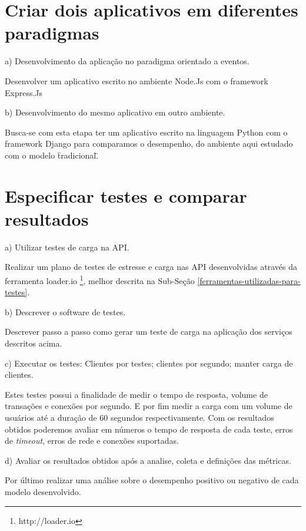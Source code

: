 \section{Criar dois aplicativos em diferentes paradigmas}
  
  \begin{compactitem}
    \item[a)] Desenvolvimento da aplicação no paradigma orientado a eventos.
    
    Desenvolver um aplicativo escrito no ambiente Node.Js com o framework Express.Js
    
    \item[b)] Desenvolvimento do mesmo aplicativo em outro ambiente.
    
    Busca-se com esta etapa ter um aplicativo escrito na linguagem Python com o framework Django
    para comparamos o desempenho, do ambiente aqui estudado com o modelo \"tradicional\".
    
  \end{compactitem}

\section{Especificar testes e comparar resultados}

  \begin{compactitem}
    \item[a)] Utilizar testes de carga na \ac{API}.
    
    Realizar um plano de testes de estresse e carga nas \ac{API} desenvolvidas através
    da ferramenta loader.io \footnote{\label{noteloader}http://loader.io}, melhor descrita na Sub-Seção \ref{ferramentas-utilizadas-para-testes}.
    
    
    \item[b)] Descrever o software de testes.
    
    Descrever passo a passo como gerar um teste de carga na aplicação dos serviços descritos acima.
    
    \item[c)] Executar os testes: Clientes por testes; clientes por segundo; manter carga de clientes.
    
    Estes testes possui a finalidade de medir o tempo de resposta, volume de transações e conexões por segundo. E por fim
    medir a carga com um volume de usuários até a duração de 60 segundos respectivamente. 
    Com os resultados obtidos poderemos avaliar em números o tempo de resposta de cada teste,
    erros de \textit{timeout}, erros de rede e conexões suportadas. 
    
    \item[d)] Avaliar os resultados obtidos após a analise, coleta e definições das métricas.
    
    Por último realizar uma análise sobre o desempenho positivo ou negativo de cada modelo desenvolvido.
    
    
  \end{compactitem}


